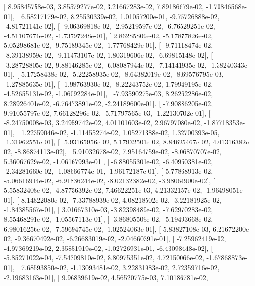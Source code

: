\documentclass{article}
\begin{document}
       [  8.95845758e-03,   3.85579277e-02,   3.21667283e-02,
          7.89186679e-02,  -1.70846568e-01],
       [  6.58217179e-02,   8.25530339e-02,   1.01057200e-01,
         -9.75726888e-02,  -4.81721141e-02],
       [ -9.06369818e-02,  -2.95219597e-02,  -6.76529251e-02,
         -4.51107674e-02,  -1.73797248e-01],
       [  2.86285809e-02,  -5.17877826e-02,   5.05298681e-02,
         -9.75189345e-02,  -1.77768429e-01],
       [ -9.71118474e-02,  -8.39138959e-02,  -9.11473107e-02,
          1.80319606e-02,  -6.69815148e-02],
       [ -3.28728805e-02,   9.88146285e-02,  -6.08087944e-02,
         -7.14141935e-02,  -1.38240343e-01],
       [  5.17258438e-02,  -5.22258935e-02,  -8.64382019e-02,
         -8.69576795e-03,  -1.27885635e-01],
       [ -1.98763930e-02,  -8.22243752e-02,   1.79949195e-02,
         -4.52655131e-02,  -1.06092284e-01],
       [ -7.93590275e-03,   8.26262286e-02,   8.28926401e-02,
         -6.76473891e-02,  -2.24189600e-01],
       [ -7.90886205e-02,   9.91055797e-02,   7.66128296e-02,
         -5.71797565e-03,  -1.22130702e-01],
       [ -8.24750008e-03,   3.24959742e-02,   4.01101603e-02,
          2.96797080e-02,  -1.87718353e-01],
       [  1.22359046e-02,  -1.11455274e-02,   1.05271388e-02,
          1.32700393e-05,  -1.31962551e-01],
       [ -5.93165956e-02,   5.17932501e-02,   8.84625467e-02,
          4.01316382e-02,  -8.86874113e-02],
       [  5.91032678e-02,   7.95164759e-02,  -8.06870707e-02,
          5.36067629e-02,  -1.06167993e-01],
       [ -6.88055301e-02,  -6.40950381e-02,  -2.34281660e-02,
         -1.08666774e-01,  -1.96172187e-01],
       [  5.77868913e-02,  -5.06616914e-02,  -6.91836244e-02,
         -8.02132382e-02,  -3.98064900e-02],
       [  5.55832408e-02,  -4.87756392e-02,   7.46622251e-03,
          4.21332157e-02,  -1.96498051e-01],
       [  8.14822080e-02,  -7.33788939e-02,   4.08218502e-02,
         -3.22181925e-02,  -1.84385567e-01],
       [  3.01667310e-03,  -3.82398489e-02,  -7.62970283e-02,
          8.55468291e-02,  -1.05567113e-01],
       [ -3.86805509e-02,  -5.19493668e-02,   6.98016256e-02,
         -7.59694745e-02,  -1.02524063e-01],
       [  5.83827108e-03,   6.21672200e-02,  -9.36670492e-02,
         -6.26683019e-02,  -2.04660391e-01],
       [ -7.25962419e-02,  -4.97369219e-02,   2.35851919e-02,
         -1.02726931e-01,  -6.43098448e-02],
       [ -5.85271022e-04,  -7.54309810e-02,   8.80975351e-02,
          4.72150066e-02,  -1.67868873e-01],
       [  7.68593850e-02,  -1.13093481e-02,   3.22831983e-02,
          2.72359716e-02,  -2.19683163e-01],
       [  9.96839619e-02,   4.56520775e-03,   7.10186781e-02,
\end{document}
